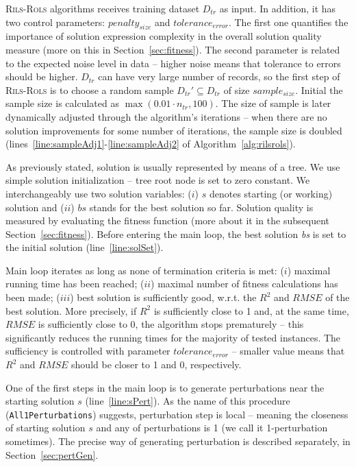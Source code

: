 \documentclass[a4paper,12pt]{elsarticle}
\begin{document}
\textsc{Rils}-\textsc{Rols}  algorithms receives training dataset $D_{tr}$ as input. In addition, it has two control parameters: $penalty_{size}$ and $tolerance_{error}$. The first one quantifies the importance of solution expression complexity in the overall solution quality measure (more on this in Section~\ref{sec:fitness}). The second parameter is related to the expected noise level in data -- higher noise means that tolerance to errors should be higher.
$D_{tr}$ can have very large number of records, so the first step of \textsc{Rils}-\textsc{Rols}  is to choose a random sample $D_{tr}' \subseteq D_{tr}$ of size $sample_{size}$. Initial the sample size is calculated as $\max(0.01 \cdot n_{tr}, 100)$. The size of sample is later dynamically adjusted through the algorithm's iterations -- when there are no solution improvements for some number of iterations, the sample size is doubled (lines~\ref{line:sampleAdj1}-\ref{line:sampleAdj2} of Algorithm~\ref{alg:rilsrols}).


As previously stated, solution is usually represented by means of a tree. We use simple solution initialization -- tree root node is set to zero constant. We interchangeably use two solution variables: ($i$) $s$ denotes starting (or working) solution and ($ii$) $bs$ stands for the best solution so far. Solution quality is measured by evaluating the fitness function (more about it in the subsequent Section~\ref{sec:fitness}). Before entering the main loop, the best solution \emph{bs} is set to the initial solution (line~\ref{line:solSet}).


Main loop iterates as long as none of termination criteria is met: ($i$) maximal running time has been reached; ($ii$) maximal number of fitness calculations has been made; ($iii$) best solution is sufficiently good, 
w.r.t. the $R^2$ and $RMSE$ of the best solution. More precisely, if $R^2$ is sufficiently close to 1 and, at the same time, $RMSE$ is sufficiently close to 0, the algorithm stops prematurely -- this significantly reduces the running times for the majority of tested instances.
The sufficiency is controlled with parameter $tolerance_{error}$ -- smaller value means that $R^2$ and $RMSE$ should be closer to 1 and 0, respectively. 


One of the first steps in the main loop is to generate perturbations near the starting solution $s$ (line~\ref{line:sPert}). 
As the name of this procedure (\texttt{All1Perturbations}) suggests, perturbation step is local -- meaning the closeness of starting solution $s$ and any of perturbations is 1 (we call it 1-perturbation sometimes). The precise way of generating perturbation is described separately, in Section~\ref{sec:pertGen}. 
\end{document}
